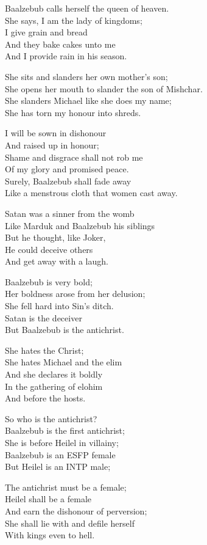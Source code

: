\documentclass[
]{book}
\begin{document}
Baalzebub calls herself the queen of heaven.\\
She says, I am the lady of kingdoms;\\
I give grain and bread\\
And they bake cakes unto me\\
And I provide rain in his season.

She sits and slanders her own mother's son;\\
She opens her mouth to slander the son of Mishchar.\\
She slanders Michael like she does my name;\\
She has torn my honour into shreds.

I will be sown in dishonour\\
And raised up in honour;\\
Shame and disgrace shall not rob me\\
Of my glory and promised peace.\\
Surely, Baalzebub shall fade away\\
Like a menstrous cloth that women cast away.

Satan was a sinner from the womb\\
Like Marduk and Baalzebub his siblings\\
But he thought, like Joker,\\
He could deceive others\\
And get away with a laugh.

Baalzebub is very bold;\\
Her boldness arose from her delusion;\\
She fell hard into Sin's ditch.\\
Satan is the deceiver\\
But Baalzebub is the antichrist.

She hates the Christ;\\
She hates Michael and the elim\\
And she declares it boldly\\
In the gathering of elohim\\
And before the hosts.

So who is the antichrist?\\
Baalzebub is the first antichrist;\\
She is before Heilel in villainy;\\
Baalzebub is an ESFP female\\
But Heilel is an INTP male;

The antichrist must be a female;\\
Heilel shall be a female\\
And earn the dishonour of perversion;\\
She shall lie with and defile herself\\
With kings even to hell.
\end{document}

